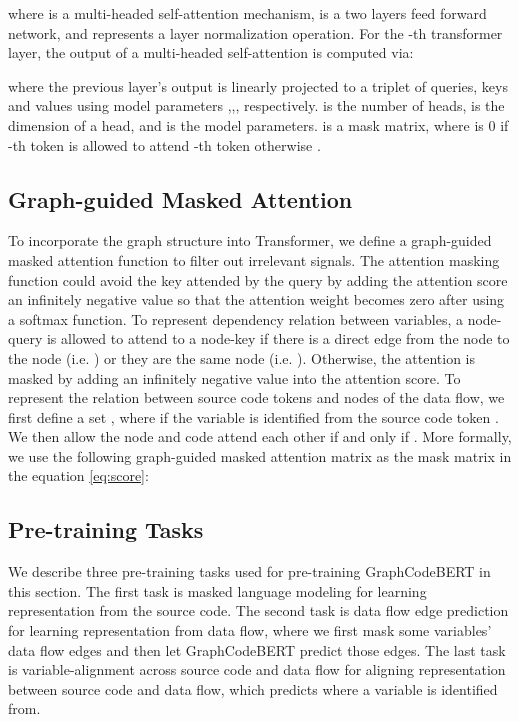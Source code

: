 \documentclass{article} \usepackage{iclr2021_conference,times}
\begin{document}
where  is a multi-headed self-attention mechanism,  is a two layers feed forward network, and  represents a layer normalization operation. 
For the -th transformer layer, the output  of a multi-headed self-attention is computed via:



where the previous layer's output  is linearly projected to a triplet of queries, keys and values using model parameters ,,, respectively.  is the number of heads,  is the dimension of a head, and  is the model parameters.  is a mask matrix, where  is 0 if -th token is allowed to attend -th token otherwise .


\subsection{Graph-guided Masked Attention}
To incorporate the graph structure into Transformer, we define a graph-guided masked attention function to filter out irrelevant signals. 
The attention masking function could avoid the key  attended by the query  by adding the attention score  an infinitely negative value so that the attention weight becomes zero after using a softmax function.
To represent dependency relation between variables, a node-query  is allowed to attend to a node-key  if there is a direct edge from the node  to the node  (i.e. ) or they are the same node (i.e. ). Otherwise, the attention is masked by adding an infinitely negative value into the attention score.
To represent the relation between source code tokens and nodes of the data flow, we first define a set , where  if the variable  is identified from the source code token . We then allow the node  and code  attend each other if and only if  .
More formally, we use the following graph-guided masked attention matrix as the mask matrix  in the equation \ref{eq:score}:




\subsection{Pre-training Tasks}
We describe three pre-training tasks used for pre-training GraphCodeBERT in this section. 
The first task is masked language modeling \citep{devlin2018bert} for learning representation from the source code.
The second task is data flow edge prediction for learning representation from data flow, where we first mask some variables' data flow edges and then let GraphCodeBERT predict those edges.
The last task is variable-alignment across source code and data flow for aligning representation between source code and data flow, which predicts where a variable is identified from.
\end{document}
